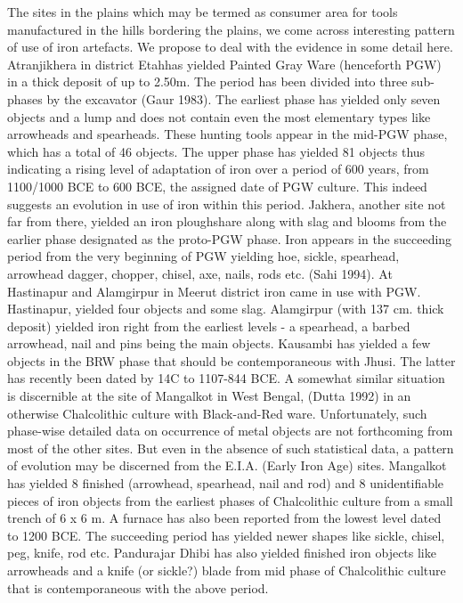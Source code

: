 The sites in the plains which may be termed as consumer area for tools manufactured in the hills bordering the plains, we come across interesting pattern of use of iron artefacts. We propose to deal with the evidence in some detail here. Atranjikhera in district Etahhas yielded Painted Gray Ware (henceforth PGW) in a thick deposit of up to 2.50m. The period has been divided into three sub-phases by the excavator (Gaur 1983). The earliest phase has yielded only seven objects and a lump and does not contain even the most elementary types like arrowheads and spearheads. These hunting tools appear in the mid-PGW phase, which has a total of 46 objects. The upper phase has yielded 81 objects thus indicating a rising level of adaptation of iron over a period of 600 years, from 1100/1000 BCE to 600 BCE, the assigned date of PGW culture. This indeed suggests an evolution in use of iron within this period. Jakhera, another site not far from there, yielded an iron ploughshare along with slag and blooms from the earlier phase designated as the proto-PGW phase. Iron appears in the succeeding period from the very beginning of PGW yielding hoe, sickle, spearhead, arrowhead dagger, chopper, chisel, axe, nails, rods etc. (Sahi 1994). At Hastinapur and Alamgirpur in Meerut district iron came in use with PGW. Hastinapur, yielded four objects and some slag. Alamgirpur (with 137 cm. thick deposit) yielded iron right from the earliest levels - a spearhead, a barbed arrowhead, nail and pins being the main objects. Kausambi has yielded a few objects in the BRW phase that should be contemporaneous with Jhusi. The latter has recently been dated by 14C to 1107-844 BCE. A somewhat similar situation is discernible at the site of Mangalkot in West Bengal, (Dutta 1992) in an otherwise Chalcolithic culture with Black-and-Red ware. Unfortunately, such phase-wise detailed data on occurrence of metal objects are not forthcoming from most of the other sites. But even in the absence of such statistical data, a pattern of evolution may be discerned from the E.I.A. (Early Iron Age) sites. Mangalkot has yielded 8 finished (arrowhead, spearhead, nail and rod) and 8 unidentifiable pieces of iron objects from the earliest phases of Chalcolithic culture from a small trench of 6 x 6 m. A furnace has also been reported from the lowest level dated to 1200 BCE. The succeeding period has yielded newer shapes like sickle, chisel, peg, knife, rod etc. Pandurajar Dhibi has also yielded finished iron objects like arrowheads and a knife (or sickle?) blade from mid phase of Chalcolithic culture that is contemporaneous with the above period.

